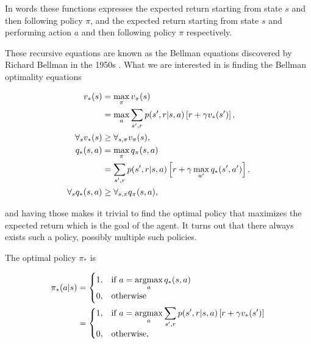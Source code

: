 \documentclass[result.tex]{subfiles}
\begin{document}
    In words these functions expresses the expected return starting from state $s$ and then following policy $\pi$, and the expected return starting from state $s$ and performing action $a$ and then following policy $\pi$ respectively.

    These recursive equations are known as the Bellman equations discovered by Richard Bellman in the 1950s \cite{bellman1952theory}. What we are interested in is finding the Bellman optimality equations

    \begin{align*}
        v_{\ast}(s)
        &= \max_{\pi} v_{\pi}(s) \\
        &= \max_a \sum_{s^\prime, r} p(s^\prime, r | s, a) \left[ r + \gamma v_\ast(s^\prime) \right], \\
        \forall_s v_{\ast}(s) &\geq \forall_{s, \pi} v_{\pi}(s), \\
        q_{\ast}(s, a)
        &= \max_{\pi} q_{\pi}(s, a) \\
        &= \sum_{s^\prime, r} p(s^\prime, r | s, a) \left[ r + \gamma \max_{a^\prime} q_\ast(s^\prime, a^\prime) \right], \\
        \forall_s q_{\ast}(s, a) &\geq \forall_{s, \pi} q_{\pi}(s, a),
    \end{align*}

    and having those makes it trivial to find the optimal policy that maximizes the expected return which is the goal of the agent. It turns out that there always exists such a policy, possibly multiple such policies.

    The optimal policy $\pi_\ast$ is

    \begin{align*}
        \pi_\ast(a | s) &=
        \begin{cases}
            1, & \text{if}\ a = \displaystyle\operatorname*{argmax}_{a} q_\ast(s, a) \\
            0, & \text{otherwise}
        \end{cases} \\
        &=
        \begin{cases}
            1, & \text{if}\ a = \displaystyle\operatorname*{argmax}_{a} \sum_{s^\prime, r} p(s^\prime, r | s, a) \left[ r + \gamma v_\ast(s^\prime) \right] \\
            0, & \text{otherwise},
        \end{cases} \\
    \end{align*}
\end{document}
